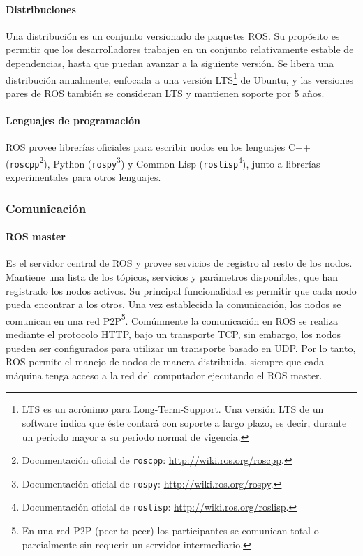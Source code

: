 \paragraph{Distribuciones} 
Una distribución es un conjunto versionado de paquetes ROS. Su propósito es permitir que los desarrolladores trabajen en un conjunto relativamente estable de dependencias, hasta que puedan avanzar a la siguiente versión. Se libera una distribución anualmente, enfocada a una versión  LTS\footnote{LTS es un acrónimo para Long-Term-Support. Una versión LTS de un software indica que éste contará con soporte a largo plazo, es decir, durante un periodo mayor a su periodo normal de vigencia.} de Ubuntu, y las versiones pares de ROS también se consideran LTS y mantienen soporte por 5 años.

\paragraph{Lenguajes de programación} ROS provee librerías oficiales para escribir nodos en los lenguajes C++ (\texttt{roscpp}\footnote{Documentación oficial de \texttt{roscpp}: \url{http://wiki.ros.org/roscpp}.}), Python (\texttt{rospy}\footnote{Documentación oficial de \texttt{rospy}: \url{http://wiki.ros.org/rospy}.}) y Common Lisp (\texttt{roslisp}\footnote{Documentación oficial de \texttt{roslisp}: \url{http://wiki.ros.org/roslisp}.}), junto a librerías experimentales para otros lenguajes.

\subsubsection{Comunicación}

\paragraph{ROS master} Es el servidor central de ROS y provee servicios de registro al resto de los nodos. Mantiene una lista de los tópicos, servicios y parámetros disponibles, que han registrado los nodos activos. Su principal funcionalidad es permitir que cada nodo pueda encontrar a los otros. Una vez establecida la comunicación, los nodos se comunican en una red P2P\footnote{En una red P2P (peer-to-peer) los participantes se comunican total o parcialmente sin requerir un servidor intermediario.}. Comúnmente la comunicación en ROS se realiza mediante el protocolo HTTP, bajo un transporte TCP, sin embargo, los nodos pueden ser configurados para utilizar un transporte basado en UDP. Por lo tanto, ROS permite el manejo de nodos de manera distribuida, siempre que cada máquina tenga acceso a la red del computador ejecutando el ROS master.

